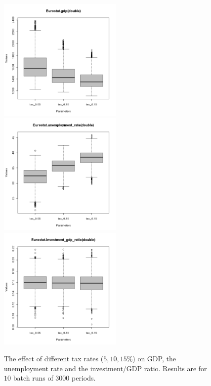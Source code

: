 \begin{figure}[ht!]
\centering\leavevmode
\begin{minipage}{7.5cm}
\centering\leavevmode
\includegraphics[width=6cm]{./batch/Eurostat-gdp-scenarios.png}\\
\includegraphics[width=6cm]{./batch/Eurostat-unemployment_rate-scenarios.png}\\
\includegraphics[width=6cm]{./batch/Eurostat-investment_gdp_ratio-scenarios.png}
\end{minipage}
\caption{The effect of different tax rates ($5, 10, 15\%$) on GDP, the unemployment rate and the investment/GDP ratio. Results are for $10$ batch runs of $3000$ periods.}
\label{Figure: scenarios}
\end{figure}
